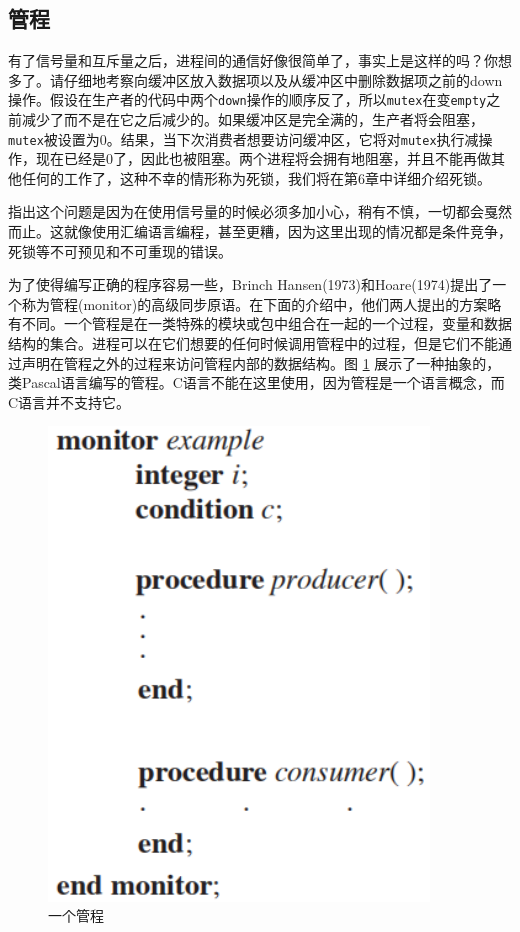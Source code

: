 	\subsection{管程}
	
	有了信号量和互斥量之后，进程间的通信好像很简单了，事实上是这样的吗？你想多了。请仔细地考察向缓冲区放入数据项以及从缓冲区中删除数据项之前的down操作。假设在生产者的代码中两个\texttt{down}操作的顺序反了，所以\texttt{mutex}在变\texttt{empty}之前减少了而不是在它之后减少的。如果缓冲区是完全满的，生产者将会阻塞，\texttt{mutex}被设置为0。结果，当下次消费者想要访问缓冲区，它将对\texttt{mutex}执行减操作，现在已经是0了，因此也被阻塞。两个进程将会拥有地阻塞，并且不能再做其他任何的工作了，这种不幸的情形称为死锁，我们将在第6章中详细介绍死锁。
	
	指出这个问题是因为在使用信号量的时候必须多加小心，稍有不慎，一切都会戛然而止。这就像使用汇编语言编程，甚至更糟，因为这里出现的情况都是条件竞争，死锁等不可预见和不可重现的错误。
	
	为了使得编写正确的程序容易一些，Brinch Hansen(1973)和Hoare(1974)提出了一个称为管程(monitor)的高级同步原语。在下面的介绍中，他们两人提出的方案略有不同。一个管程是在一类特殊的模块或包中组合在一起的一个过程，变量和数据结构的集合。进程可以在它们想要的任何时候调用管程中的过程，但是它们不能通过声明在管程之外的过程来访问管程内部的数据结构。图 \ref{fig:monitor} 展示了一种抽象的，类Pascal语言编写的管程。C语言不能在这里使用，因为管程是一个语言概念，而C语言并不支持它。
	 
	\begin{figure}[ht]\small
		\centering
		\includegraphics[width=0.90\textwidth]{FIG/2-33.png}
		\caption{一个管程}\label{fig:monitor}
	\end{figure}

